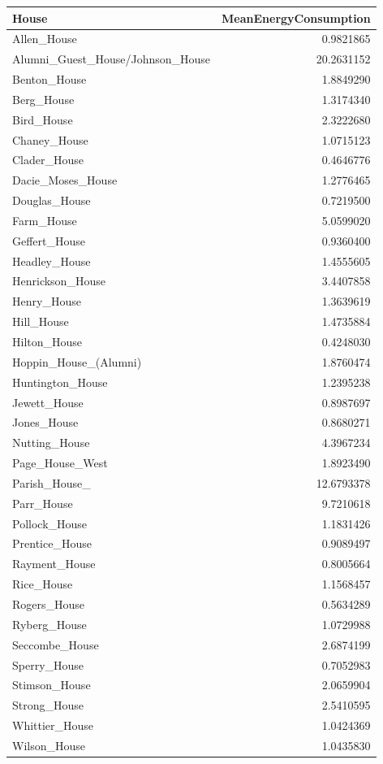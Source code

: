 \documentclass[
]{book}
\begin{document}
\begin{tabular}{l|r}
\hline
House & MeanEnergyConsumption\\
\hline
Allen\_House & 0.9821865\\
\hline
Alumni\_Guest\_House/Johnson\_House & 20.2631152\\
\hline
Benton\_House & 1.8849290\\
\hline
Berg\_House & 1.3174340\\
\hline
Bird\_House & 2.3222680\\
\hline
Chaney\_House & 1.0715123\\
\hline
Clader\_House & 0.4646776\\
\hline
Dacie\_Moses\_House & 1.2776465\\
\hline
Douglas\_House & 0.7219500\\
\hline
Farm\_House & 5.0599020\\
\hline
Geffert\_House & 0.9360400\\
\hline
Headley\_House & 1.4555605\\
\hline
Henrickson\_House & 3.4407858\\
\hline
Henry\_House & 1.3639619\\
\hline
Hill\_House & 1.4735884\\
\hline
Hilton\_House & 0.4248030\\
\hline
Hoppin\_House\_(Alumni) & 1.8760474\\
\hline
Huntington\_House & 1.2395238\\
\hline
Jewett\_House & 0.8987697\\
\hline
Jones\_House & 0.8680271\\
\hline
Nutting\_House & 4.3967234\\
\hline
Page\_House\_West & 1.8923490\\
\hline
Parish\_House\_ & 12.6793378\\
\hline
Parr\_House & 9.7210618\\
\hline
Pollock\_House & 1.1831426\\
\hline
Prentice\_House & 0.9089497\\
\hline
Rayment\_House & 0.8005664\\
\hline
Rice\_House & 1.1568457\\
\hline
Rogers\_House & 0.5634289\\
\hline
Ryberg\_House & 1.0729988\\
\hline
Seccombe\_House & 2.6874199\\
\hline
Sperry\_House & 0.7052983\\
\hline
Stimson\_House & 2.0659904\\
\hline
Strong\_House & 2.5410595\\
\hline
Whittier\_House & 1.0424369\\
\hline
Wilson\_House & 1.0435830\\
\hline
\end{tabular}
\end{document}
